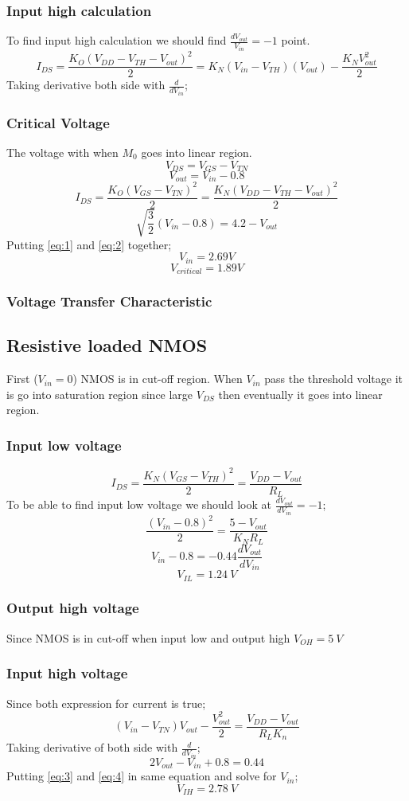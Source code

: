 \documentclass[11 pt]{article}
\begin{document}
\subsubsection*{Input high calculation}
To find input high calculation we should find $\frac{dV_{out}}{V_{in}}=-1$ point.
\[I_{DS}=\frac{K_O(V_{DD}-V_{TH}-V_{out})^2}{2}=K_N(V_{in}-V_{TH})(V_{out})-\frac{K_N V_{out}^2}{2}\]
Taking derivative both side with $\frac{d}{dV_{in}}$;


\subsubsection*{Critical Voltage}
The voltage with when $M_0$ goes into linear region.
\[V_{DS}=V_{GS}-V_{TN}\]
\[V_{out}=V_{in}-0.8 \tag{1} \label{eq:1} \] 
\[I_{DS}=\frac{K_O(V_{GS}-V_{TN})^2}{2}=\frac{K_N(V_{DD}-V_{TH}-V_{out})^2}{2}\]
\[\sqrt{\frac{3}{2}}(V_{in}-0.8)=4.2-V_{out}\tag{2} \label{eq:2} \]
Putting \eqref{eq:1} and \eqref{eq:2} together;
\[V_{in}=2.69 V\]
\[V_{critical}=1.89 V\]
\subsubsection*{Voltage Transfer Characteristic}

\subsection*{Resistive loaded NMOS}
First ($V_{in}=0$) NMOS is in cut-off region. When $V_{in}$ pass the threshold voltage it is go into saturation region since large $V_{DS}$ then eventually it goes into linear region.
\subsubsection*{Input low voltage}
\[I_{DS}=\frac{K_N(V_{GS}-V_{TH})^2}{2}=\frac{V_{DD}-V_{out}}{R_L}\]
To be able to find input low voltage we should look at $\frac{dV_{out}}{dV_{in}}=-1$;
\[\frac{(V_{in}-0.8)^2}{2}=\frac{5-V_{out}}{K_NR_L}\]
\[V_{in}-0.8=-0.44\frac{dV_{out}}{dV_{in}}\]
\[V_{IL}=1.24 \>V\]
\subsubsection*{Output high voltage}
Since NMOS is in cut-off when input low and output high $V_{OH}=5 \>V$
\subsubsection*{Input high voltage}
Since both expression for current is true;
\[(V_{in}-V_{TN})V_{out}-\frac{V_{out}^2}{2}=\frac{V_{DD}-V_{out}}{R_L K_n} \tag{3} \label{eq:3} \]
Taking derivative of both side with $\frac{d}{dV_{in}}$;
\[
2V_{out}-V_{in}+0.8=0.44 \tag{4} \label{eq:4}
\]
Putting \eqref{eq:3} and \eqref{eq:4} in same equation and solve for $V_{in}$;
\[V_{IH}=2.78\>V\]
\end{document}
